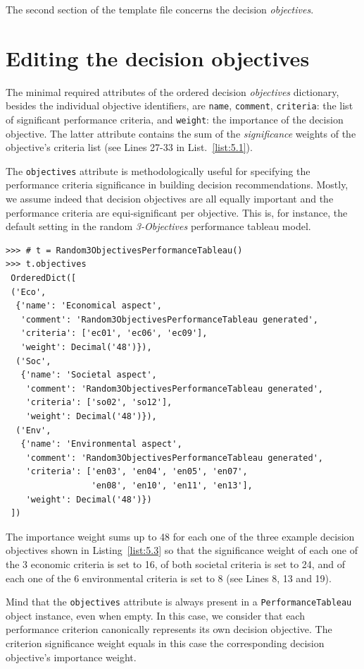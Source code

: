The second section of the template file concerns the decision \emph{objectives}.

\section{Editing the decision objectives}
\label{sec:5.3}

The minimal required attributes of the ordered decision \emph{objectives} dictionary, besides the individual objective identifiers, are \texttt{name}, \texttt{comment}, \texttt{criteria}: the list of significant performance criteria, and \texttt{weight}: the importance of the decision objective. The latter attribute contains the sum of the \emph{significance} weights of the objective's criteria list (see Lines 27-33 in List.~\vref{list:5.1}). 

The \texttt{objectives} attribute is methodologically useful for specifying the performance criteria significance in building decision recommendations. Mostly, we assume indeed that decision objectives are all equally important and the performance criteria are equi-significant per objective. This is, for instance, the default setting in the random \emph{3-Objectives} performance tableau model.
\begin{lstlisting}[caption={Example of decision objectives' description},label=list:5.3]
>>> # t = Random3ObjectivesPerformanceTableau()
>>> t.objectives
 OrderedDict([
 ('Eco',
  {'name': 'Economical aspect',
   'comment': 'Random3ObjectivesPerformanceTableau generated',
   'criteria': ['ec01', 'ec06', 'ec09'],
   'weight': Decimal('48')}),
  ('Soc',
   {'name': 'Societal aspect',
    'comment': 'Random3ObjectivesPerformanceTableau generated',
    'criteria': ['so02', 'so12'],
    'weight': Decimal('48')}),
  ('Env',
   {'name': 'Environmental aspect',
    'comment': 'Random3ObjectivesPerformanceTableau generated',
    'criteria': ['en03', 'en04', 'en05', 'en07',
                 'en08', 'en10', 'en11', 'en13'],
    'weight': Decimal('48')})
 ])
\end{lstlisting}

The importance weight sums up to 48 for each one of the three example decision objectives shown in Listing~\vref{list:5.3} so that the significance weight of each one of the 3 economic criteria is set to 16, of both societal criteria is set to 24, and of each one of the 6 environmental criteria is set to 8 (see Lines 8, 13 and 19).

Mind that the \texttt{objectives} attribute is always present in a \texttt{PerformanceTab\-leau} object instance, even when empty. In this case, we consider that each performance criterion canonically represents its own decision objective. The criterion significance weight equals in this case the corresponding decision objective's importance weight.

